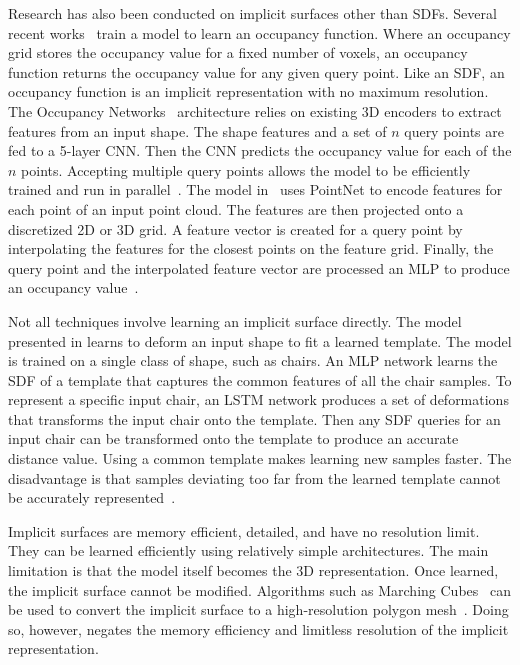 Research has also been conducted on implicit surfaces other than SDFs. Several recent works~\cite{Mescheder2019, Peng2020} train a model to learn an occupancy function. Where an occupancy grid stores the occupancy value for a fixed number of voxels, an occupancy function returns the occupancy value for any given query point. Like an SDF, an occupancy function is an implicit representation with no maximum resolution. The Occupancy Networks~\cite{Mescheder2019} architecture relies on existing 3D encoders to extract features from an input shape. The shape features and a set of $n$ query points are fed to a 5-layer CNN. Then the CNN predicts the occupancy value for each of the $n$ points. Accepting multiple query points allows the model to be efficiently trained and run in parallel~\cite{Mescheder2019}. The model in~\cite{Peng2020} uses PointNet to encode features for each point of an input point cloud. The features are then projected onto a discretized 2D or 3D grid. A feature vector is created for a query point by interpolating the features for the closest points on the feature grid. Finally, the query point and the interpolated feature vector are processed an MLP to produce an occupancy value~\cite{Peng2020}.

Not all techniques involve learning an implicit surface directly. The model presented in \cite{Zheng2021} learns to deform an input shape to fit a learned template. The model is trained on a single class of shape, such as chairs. An MLP network learns the SDF of a template that captures the common features of all the chair samples. To represent a specific input chair, an LSTM network produces a set of deformations that transforms the input chair onto the template. Then any SDF queries for an input chair can be transformed onto the template to produce an accurate distance value. Using a common template makes learning new samples faster. The disadvantage is that samples deviating too far from the learned template cannot be accurately represented~\cite{Zheng2021}.

Implicit surfaces are memory efficient, detailed, and have no resolution limit. They can be learned efficiently using relatively simple architectures. The main limitation is that the model itself becomes the 3D representation. Once learned, the implicit surface cannot be modified. Algorithms such as Marching Cubes~\cite{Lorensen1987} can be used to convert the implicit surface to a high-resolution polygon mesh~\cite{Xiao2020}. Doing so, however, negates the memory efficiency and limitless resolution of the implicit representation.

